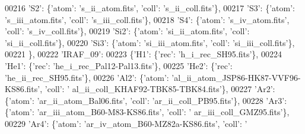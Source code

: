 \begin{DoxyCode}
00216                             \textcolor{stringliteral}{'S2'}: \{\textcolor{stringliteral}{'atom'}: \textcolor{stringliteral}{'s\_ii\_atom.fits'}, \textcolor{stringliteral}{'coll'}: \textcolor{stringliteral}{'s\_ii\_coll.fits'}\},
00217                             \textcolor{stringliteral}{'S3'}: \{\textcolor{stringliteral}{'atom'}: \textcolor{stringliteral}{'s\_iii\_atom.fits'}, \textcolor{stringliteral}{'coll'}: \textcolor{stringliteral}{'s\_iii\_coll.fits'}\},
00218                             \textcolor{stringliteral}{'S4'}: \{\textcolor{stringliteral}{'atom'}: \textcolor{stringliteral}{'s\_iv\_atom.fits'}, \textcolor{stringliteral}{'coll'}: \textcolor{stringliteral}{'s\_iv\_coll.fits'}\},
00219                             \textcolor{stringliteral}{'Si2'}: \{\textcolor{stringliteral}{'atom'}: \textcolor{stringliteral}{'si\_ii\_atom.fits'}, \textcolor{stringliteral}{'coll'}: \textcolor{stringliteral}{'si\_ii\_coll.fits'}\},
00220                             \textcolor{stringliteral}{'Si3'}: \{\textcolor{stringliteral}{'atom'}: \textcolor{stringliteral}{'si\_iii\_atom.fits'}, \textcolor{stringliteral}{'coll'}: \textcolor{stringliteral}{'si\_iii\_coll.fits'}\},
00221                             \},
00222                          \textcolor{stringliteral}{'IRAF\_09'}:
00223                            \{\textcolor{stringliteral}{'H1'}: \{\textcolor{stringliteral}{'rec'}: \textcolor{stringliteral}{'h\_i\_rec\_SH95.fits'}\},
00224                             \textcolor{stringliteral}{'He1'}: \{\textcolor{stringliteral}{'rec'}: \textcolor{stringliteral}{'he\_i\_rec\_Pal12-Pal13.fits'}\},
00225                             \textcolor{stringliteral}{'He2'}: \{\textcolor{stringliteral}{'rec'}: \textcolor{stringliteral}{'he\_ii\_rec\_SH95.fits'}\},
00226                             \textcolor{stringliteral}{'Al2'}: \{\textcolor{stringliteral}{'atom'}: \textcolor{stringliteral}{'al\_ii\_atom\_JSP86-HK87-VVF96-KS86.fits'}, \textcolor{stringliteral}{'coll'}: \textcolor{stringliteral}{'
      al\_ii\_coll\_KHAF92-TBK85-TBK84.fits'}\},
00227                             \textcolor{stringliteral}{'Ar2'}: \{\textcolor{stringliteral}{'atom'}: \textcolor{stringliteral}{'ar\_ii\_atom\_Bal06.fits'}, \textcolor{stringliteral}{'coll'}: \textcolor{stringliteral}{'ar\_ii\_coll\_PB95.fits'}\},
00228                             \textcolor{stringliteral}{'Ar3'}: \{\textcolor{stringliteral}{'atom'}: \textcolor{stringliteral}{'ar\_iii\_atom\_B60-M83-KS86.fits'}, \textcolor{stringliteral}{'coll'}: \textcolor{stringliteral}{'
      ar\_iii\_coll\_GMZ95.fits'}\},
00229                             \textcolor{stringliteral}{'Ar4'}: \{\textcolor{stringliteral}{'atom'}: \textcolor{stringliteral}{'ar\_iv\_atom\_B60-MZ82a-KS86.fits'}, \textcolor{stringliteral}{'coll'}: \textcolor{stringliteral}{'
}
\end{DoxyCode}
